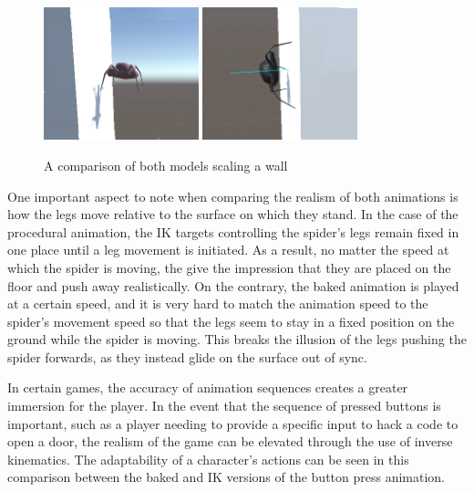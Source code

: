 \begin{figure}[h!]
    \centering
    \captionsetup{justification=centering}
    \includegraphics[width=0.4\textwidth]{grafika/sp_b_wall.png}
    \includegraphics[width=0.4\textwidth]{grafika/sp_ik_wall.png}
    \caption{A comparison of both models scaling a wall}
    \label{fig:sp_wall}
\end{figure}

One important aspect to note when comparing the realism of both animations is
how the legs move relative to the surface on which they stand. In the case of
the procedural animation, the IK targets controlling the spider's legs remain
fixed in one place until a leg movement is initiated. As a result, no matter the
speed at which the spider is moving, the give the impression that they are
placed on the floor and push away realistically. On the contrary, the baked
animation is played at a certain speed, and it is very hard to match the
animation speed to the spider's movement speed so that the legs seem to stay in a fixed
position on the ground while the spider is moving. This breaks the illusion of
the legs pushing the spider forwards, as they instead glide on the surface out
of sync.

In certain games, the accuracy of animation sequences creates a greater
immersion for the player. In the event that the sequence of pressed buttons is
important, such as a player needing to provide a specific input to hack a code
to open a door, the realism of the game can be elevated through the use of
inverse kinematics. The adaptability of a character's actions can be seen in this
comparison between the baked and IK versions of the button press animation.

